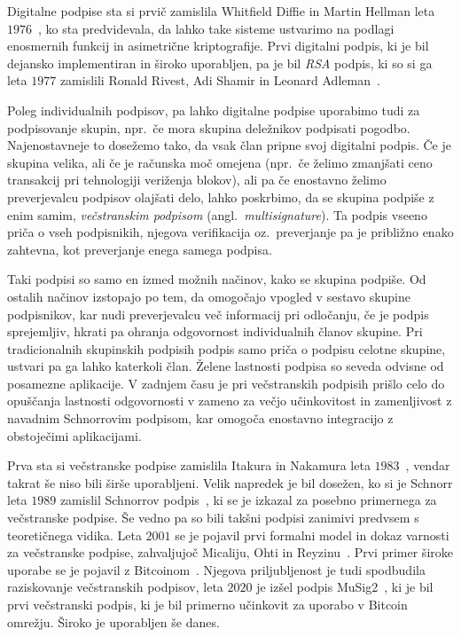 Digitalne podpise sta si prvič zamislila Whitfield Diffie in Martin Hellman leta $1976$~\cite{diffie1976new},
ko sta predvidevala, da lahko take sisteme ustvarimo na podlagi enosmernih funkcij in asimetrične
kriptografije. Prvi digitalni podpis, ki je bil dejansko implementiran in široko uporabljen, pa je
bil \textit{RSA} podpis, ki so si ga leta $1977$ zamislili Ronald Rivest, Adi Shamir in Leonard
Adleman~\cite{rivest1978rsa}.

Poleg individualnih podpisov, pa lahko digitalne podpise uporabimo tudi za podpisovanje skupin, npr.\
če mora skupina deležnikov podpisati pogodbo. Najenostavneje to dosežemo tako, da vsak član pripne
svoj digitalni podpis. Če je skupina velika, ali če je računska moč omejena (npr.\ če želimo zmanjšati
ceno transakcij pri tehnologiji veriženja blokov), ali pa če enostavno želimo preverjevalcu podpisov
olajšati delo, lahko poskrbimo, da se skupina podpiše z enim samim, \textit{večstranskim podpisom}
(angl.\ \textit{multisignature}). Ta podpis vseeno priča o vseh podpisnikih, njegova verifikacija
oz.\ preverjanje pa je približno enako zahtevna, kot preverjanje enega samega podpisa.

Taki podpisi so samo en izmed možnih načinov, kako se skupina podpiše. Od ostalih načinov izstopajo
po tem, da omogočajo vpogled v sestavo skupine podpisnikov, kar nudi preverjevalcu več informacij
pri odločanju, če je podpis sprejemljiv, hkrati pa ohranja odgovornost individualnih članov skupine.
Pri tradicionalnih skupinskih podpisih podpis samo priča o podpisu celotne skupine, ustvari pa ga
lahko katerkoli član. Želene lastnosti podpisa so seveda odvisne od posamezne aplikacije. V zadnjem
času je pri večstranskih podpisih prišlo celo do opuščanja lastnosti odgovornosti v zameno za večjo
učinkovitost in zamenljivost z navadnim Schnorrovim podpisom, kar omogoča enostavno integracijo z
obstoječimi aplikacijami.

Prva sta si večstranske podpise zamislila Itakura in Nakamura leta $1983$~\cite{itakura1983multi},
vendar takrat še niso bili širše uporabljeni. Velik napredek je bil dosežen, ko si je Schnorr leta
$1989$ zamislil Schnorrov podpis~\cite{schnorr1989sig}, ki se je izkazal za posebno primernega za
večstranske podpise. Še vedno pa so bili takšni podpisi zanimivi predvsem s teoretičnega vidika. Leta
$2001$ se je pojavil prvi formalni model in dokaz varnosti za večstranske podpise, zahvaljujoč
Micaliju, Ohti in Reyzinu~\cite{micali2001asm}. Prvi primer široke uporabe se je pojavil z
Bitcoinom~\cite{nakamoto2009bitcoin}. Njegova priljubljenost je tudi spodbudila raziskovanje
večstranskih podpisov, leta $2020$ je izšel podpis MuSig2~\cite{jonas2020musig2}, ki je bil prvi
večstranski podpis, ki je bil primerno učinkovit za uporabo v Bitcoin omrežju. Široko je uporabljen
še danes.

